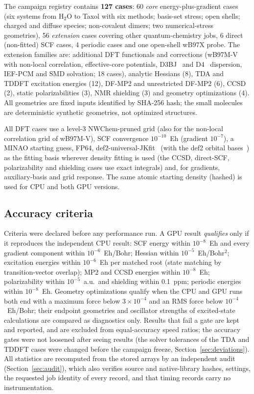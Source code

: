 The campaign registry contains \textbf{127 cases}: 60 \emph{core} energy-plus-gradient cases (six systems from H$_2$O to Taxol with six methods; basis-set stress; open shells; charged and diffuse species; non-covalent dimers; two numerical-stress geometries), 56 \emph{extension} cases covering other quantum-chemistry jobs, 6 direct (non-fitted) SCF cases, 4 periodic cases and one open-shell wB97X probe. The extension families are: additional DFT functionals and corrections (wB97M-V~\cite{mardirossian2016} with non-local correlation, effective-core potentials, D3BJ~\cite{grimme2011} and D4~\cite{caldeweyher2019} dispersion, IEF-PCM and SMD solvation; 18 cases), analytic Hessians (8), TDA and TDDFT excitation energies (12), DF-MP2 and unrestricted DF-MP2 (6), CCSD (2), static polarizabilities (3), NMR shielding (3) and geometry optimizations (4). All geometries are fixed inputs identified by SHA-256 hash; the small molecules are deterministic synthetic geometries, not optimized structures.

All DFT cases use a level-3 NWChem-pruned grid (also for the non-local correlation grid of wB97M-V), SCF convergence $10^{-10}$~Eh (gradient $10^{-7}$), a MINAO starting guess, FP64, def2-universal-JKfit~\cite{weigend2006,weigend2008} (with the def2 orbital bases~\cite{weigend2005}) as the fitting basis wherever density fitting is used (the CCSD, direct-SCF, polarizability and shielding cases use exact integrals) and, for gradients, auxiliary-basis and grid response. The same atomic starting density (hashed) is used for CPU and both GPU versions.

\subsection{Accuracy criteria}

Criteria were declared before any performance run. A GPU result \emph{qualifies} only if it reproduces the independent CPU result: SCF energy within $10^{-8}$~Eh and every gradient component within $10^{-6}$~Eh/Bohr; Hessian within $10^{-5}$~Eh/Bohr$^2$; excitation energies within $10^{-6}$~Eh per matched root (state matching by transition-vector overlap); MP2 and CCSD energies within $10^{-8}$~Eh; polarizability within $10^{-5}$~a.u.\ and shielding within 0.1~ppm; periodic energies within $10^{-8}$~Eh. Geometry optimizations qualify when the CPU and GPU runs both end with a maximum force below $3\times10^{-4}$ and an RMS force below $10^{-4}$~Eh/Bohr; their endpoint geometries and oscillator strengths of excited-state calculations are compared as diagnostics only. Results that fail a gate are kept and reported, and are excluded from equal-accuracy speed ratios; the accuracy gates were not loosened after seeing results (the solver tolerances of the TDA and TDDFT cases were changed before the campaign freeze, Section~\ref{sec:deviations}). All statistics are recomputed from the stored arrays by an independent audit (Section~\ref{sec:audit}), which also verifies source and native-library hashes, settings, the requested job identity of every record, and that timing records carry no instrumentation.

